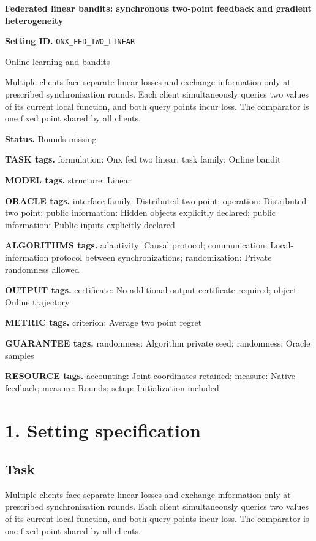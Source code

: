 \documentclass[10pt,a4paper]{article}
\begin{document}
\raggedright

{\LARGE\bfseries\sffamily\color{AtlasNavy} Federated linear bandits: synchronous two-point feedback and gradient heterogeneity\par}\vspace{5pt}
\textbf{Setting ID.} \texttt{ONX\_\allowbreak{}FED\_\allowbreak{}TWO\_\allowbreak{}LINEAR}

Online learning and bandits

Multiple clients face separate linear losses and exchange information only at prescribed synchronization rounds. Each client simultaneously queries two values of its current local function, and both query points incur loss. The comparator is one fixed point shared by all clients.

\textbf{Status.} Bounds missing

\textbf{TASK tags.} formulation: Onx fed two linear; task family: Online bandit

\textbf{MODEL tags.} structure: Linear

\textbf{ORACLE tags.} interface family: Distributed two point; operation: Distributed two point; public information: Hidden objects explicitly declared; public information: Public inputs explicitly declared

\textbf{ALGORITHMS tags.} adaptivity: Causal protocol; communication: Local-information protocol between synchronizations; randomization: Private randomness allowed

\textbf{OUTPUT tags.} certificate: No additional output certificate required; object: Online trajectory

\textbf{METRIC tags.} criterion: Average two point regret

\textbf{GUARANTEE tags.} randomness: Algorithm private seed; randomness: Oracle samples

\textbf{RESOURCE tags.} accounting: Joint coordinates retained; measure: Native feedback; measure: Rounds; setup: Initialization included

\section{1. Setting specification}
\subsection{Task}
Multiple clients face separate linear losses and exchange information only at prescribed synchronization rounds. Each client simultaneously queries two values of its current local function, and both query points incur loss. The comparator is one fixed point shared by all clients.
\end{document}
